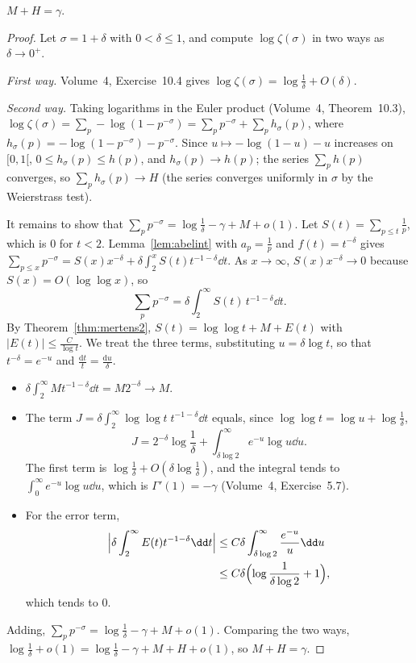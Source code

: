 \begin{lemma}\label{lem:mplush}
$M+H=\gamma$.
\end{lemma}
\begin{proof}
Let $\sigma=1+\delta$ with $0<\delta\le1$, and compute $\log\zeta(\sigma)$ in two ways as $\delta\to0^+$.

\emph{First way.} Volume~4, Exercise~10.4 gives $\log\zeta(\sigma)=\log\frac1\delta+O(\delta)$.

\emph{Second way.} Taking logarithms in the Euler product (Volume~4, Theorem~10.3),
$\log\zeta(\sigma)=\sum_p-\log(1-p^{-\sigma})=\sum_pp^{-\sigma}+\sum_ph_\sigma(p)$, where $h_\sigma(p)=-\log(1-p^{-\sigma})-p^{-\sigma}$. Since $u\mapsto-\log(1-u)-u$
increases on $[0,1[$, $0\le h_\sigma(p)\le h(p)$, and $h_\sigma(p)\to h(p)$; the series $\sum_ph(p)$ converges, so $\sum_ph_\sigma(p)\to H$ (the series converges uniformly
in $\sigma$ by the Weierstrass test).

It remains to show that $\sum_pp^{-\sigma}=\log\frac1\delta-\gamma+M+o(1)$. Let $S(t)=\sum_{p\le t}\frac1p$, which is $0$ for $t<2$. Lemma~\ref{lem:abelint} with $a_p=\frac1p$ and
$f(t)=t^{-\delta}$ gives $\sum_{p\le x}p^{-\sigma}=S(x)x^{-\delta}+\delta\int_2^xS(t)t^{-1-\delta}\dd t$. As $x\to\infty$, $S(x)x^{-\delta}\to0$ because $S(x)=O(\log\log x)$, so
\[
\sum_pp^{-\sigma}=\delta\int_2^\infty S(t)\,t^{-1-\delta}\dd t.
\]
By Theorem~\ref{thm:mertens2}, $S(t)=\log\log t+M+E(t)$ with $|E(t)|\le\frac C{\log t}$. We treat the three terms, substituting $u=\delta\log t$, so that
$t^{-\delta}=e^{-u}$ and $\frac{\mathrm dt}t=\frac{\mathrm du}\delta$.
\begin{itemize}
\item $\delta\int_2^\infty Mt^{-1-\delta}\dd t=M2^{-\delta}\to M$.
\item The term $J=\delta\int_2^\infty\log\log t\;t^{-1-\delta}\dd t$ equals, since $\log\log t=\log u+\log\frac1\delta$,
\[
J=2^{-\delta}\log\frac1\delta+\int_{\delta\log2}^\infty e^{-u}\log u\dd u.
\]
The first term is $\log\frac1\delta+O(\delta\log\frac1\delta)$, and the integral tends to $\int_0^\infty e^{-u}\log u\dd u$, which is $\Gamma'(1)=-\gamma$ (Volume~4, Exercise~5.7).
\item For the error term,
\[
\begin{aligned}\Bigl|\delta\int_2^\infty E(t)t^{-1-\delta}\dd t\Bigr|&\le C\delta\int_{\delta\log2}^\infty\frac{e^{-u}}u\dd u\\&\le C\delta\Bigl(\log\frac1{\delta\log2}+1\Bigr),\end{aligned}
\]
which tends to $0$.
\end{itemize}
Adding, $\sum_pp^{-\sigma}=\log\frac1\delta-\gamma+M+o(1)$. Comparing the two ways, $\log\frac1\delta+o(1)=\log\frac1\delta-\gamma+M+H+o(1)$, so $M+H=\gamma$.
\end{proof}

